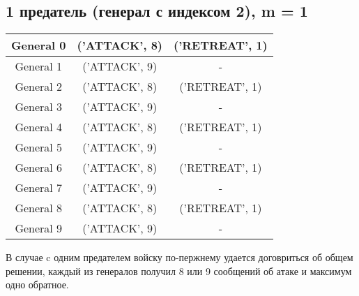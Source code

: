 \documentclass[12pt,a4paper]{article}
\begin{document}
            \subsection{1 предатель (генерал с индексом 2), m = 1}
                \begin{center}
                    \begin{tabular}{|c|c|c|}
                        \hline
                        General 0 & ('ATTACK', 8) & ('RETREAT', 1) \\ \hline
                        General 1 & ('ATTACK', 9) & - \\ \hline
                        General 2 & ('ATTACK', 8) & ('RETREAT', 1) \\ \hline
                        General 3 & ('ATTACK', 9) & - \\ \hline
                        General 4 & ('ATTACK', 8) & ('RETREAT', 1) \\ \hline
                        General 5 & ('ATTACK', 9) & - \\ \hline
                        General 6 & ('ATTACK', 8) & ('RETREAT', 1) \\ \hline
                        General 7 & ('ATTACK', 9) & - \\ \hline
                        General 8 & ('ATTACK', 8) & ('RETREAT', 1) \\ \hline
                        General 9 & ('ATTACK', 9) & - \\ \hline
                    \end{tabular}
            \end{center}
            В случае c одним предателем войску по-пержнему удается договриться об общем решении, каждый из генералов получил 8 или 9 сообщений об атаке и максимум одно обратное.
\end{document}
